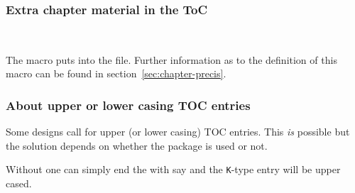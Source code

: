 \subsubsection{Extra chapter material in the ToC}
\label{sec:extra-chapt-mater}

\begin{syntax}
\cmd{\precistoctext} \cmd{\precistocfont} \cmd{\precistocformat}\\
\end{syntax}
The \cmd{\chapterprecistoc} macro puts  \cmd{\precistoctext} into 
the  file. Further information as to the definition of
this macro can be found in section~\ref{sec:chapter-precis}.


\subsubsection{About upper or lower casing TOC entries}
\label{sec:about-upper-or}

Some designs call for upper (or lower casing) TOC entries. This
\emph{is} possible but the solution depends on whether the
 package is used or not.

Without  one can simply end the  with say
 and the \texttt{K}-type entry will be upper cased.

